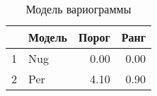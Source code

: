 \begin{table}[H]
\centering
\begin{tabular}{rlrr}
  \hline
 & Модель & Порог & Ранг \\ 
  \hline
1 & Nug & 0.00 & 0.00 \\ 
  2 & Per & 4.10 & 0.90 \\ 
   \hline
\end{tabular}
\caption{Модель вариограммы} 
\label{table:manual_model}
\end{table}
